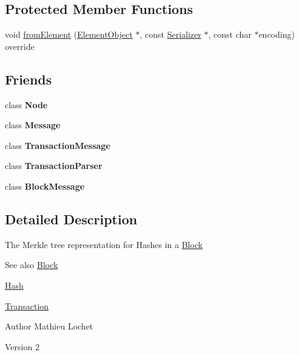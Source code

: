 \subsection*{Protected Member Functions}
\begin{DoxyCompactItemize}
\item 
void \mbox{\hyperlink{classMerkleTree_a083ad348bfd770f2400f190112ff39a3}{from\+Element}} (\mbox{\hyperlink{classElementObject}{Element\+Object}} $\ast$, const \mbox{\hyperlink{classSerializer}{Serializer}} $\ast$, const char $\ast$encoding) override
\end{DoxyCompactItemize}
\subsection*{Friends}
\begin{DoxyCompactItemize}
\item 
\mbox{\label{classMerkleTree_a6db9d28bd448a131448276ee03de1e6d}} 
class {\bfseries Node}
\item 
\mbox{\label{classMerkleTree_a658ef47bd757fd5e0f13adab5a417ced}} 
class {\bfseries Message}
\item 
\mbox{\label{classMerkleTree_a6a4f3eb8755476d75f7f57cef4cd3853}} 
class {\bfseries Transaction\+Message}
\item 
\mbox{\label{classMerkleTree_a760b1478b5214c122458f0f19d45c127}} 
class {\bfseries Transaction\+Parser}
\item 
\mbox{\label{classMerkleTree_a9acb1bbbd9c9589da9453187cfb6a794}} 
class {\bfseries Block\+Message}
\end{DoxyCompactItemize}


\subsection{Detailed Description}
The Merkle tree representation for Hashes in a \mbox{\hyperlink{classBlock}{Block}} \begin{DoxySeeAlso}{See also}
\mbox{\hyperlink{classBlock}{Block}} 

\mbox{\hyperlink{classHash}{Hash}} 

\mbox{\hyperlink{classTransaction}{Transaction}}
\end{DoxySeeAlso}
\begin{DoxyAuthor}{Author}
Mathieu Lochet 
\end{DoxyAuthor}
\begin{DoxyVersion}{Version}
2 
\end{DoxyVersion}


